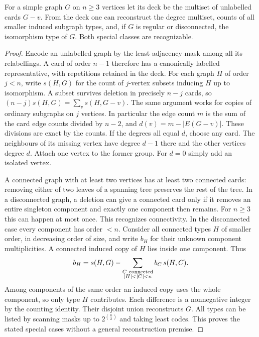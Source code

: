 \begin{theorem}\leavevmode\label{thm:deck}
For a simple graph $G$ on $n\ge3$ vertices let its deck be the multiset of
unlabelled cards $G-v$. From the deck one can reconstruct the degree multiset,
counts of all smaller induced subgraph types, and, if $G$ is regular or
disconnected, the isomorphism type of $G$. Both special classes are recognizable.
\end{theorem}
\begin{proof}
Encode an unlabelled graph by the least adjacency mask among all its
relabellings. A card of order $n-1$ therefore has a canonically labelled
representative, with repetitions retained in the deck. For each graph $H$
of order $j<n$, write $s(H,G)$ for the count of $j$-vertex subsets inducing
$H$ up to isomorphism. A subset survives deletion in precisely $n-j$ cards,
so $(n-j)s(H,G)=\sum_v s(H,G-v)$. The same argument works for copies of
ordinary subgraphs on $j$ vertices. In particular the edge count $m$ is
the sum of the card edge counts divided by $n-2$, and $d(v)=m-|E(G-v)|$.
These divisions are exact by the counts. If the degrees all equal $d$,
choose any card. The neighbours of its missing vertex have degree $d-1$ there
and the other vertices degree $d$. Attach one vertex to the former group.
For $d=0$ simply add an isolated vertex.

A connected graph with at least two vertices has at least two connected
cards: removing either of two leaves of a spanning tree preserves the rest
of the tree. In a disconnected graph, a deletion can give a connected card
only if it removes an entire singleton component and exactly one component
then remains. For $n\ge3$ this can happen at most once. This recognizes
connectivity. In the disconnected case every component has order $<n$.
Consider all connected types $H$ of smaller order, in decreasing order of size,
and write $b_H$ for their unknown component multiplicities. A connected
induced copy of $H$ lies inside one component. Thus
\[
 b_H=s(H,G)-\sum_{\substack{C\ {\rm connected}\\|H|<|C|< n}}
                   b_C\,s(H,C).
\]
Among components of the same order an induced copy uses the whole component,
so only type $H$ contributes. Each difference is a nonnegative integer by
the counting identity. Their disjoint union reconstructs $G$. All types
can be listed by scanning masks up to $2^{\binom n2}$ and taking least codes.
This proves the stated special cases without a general reconstruction premise.
\end{proof}
